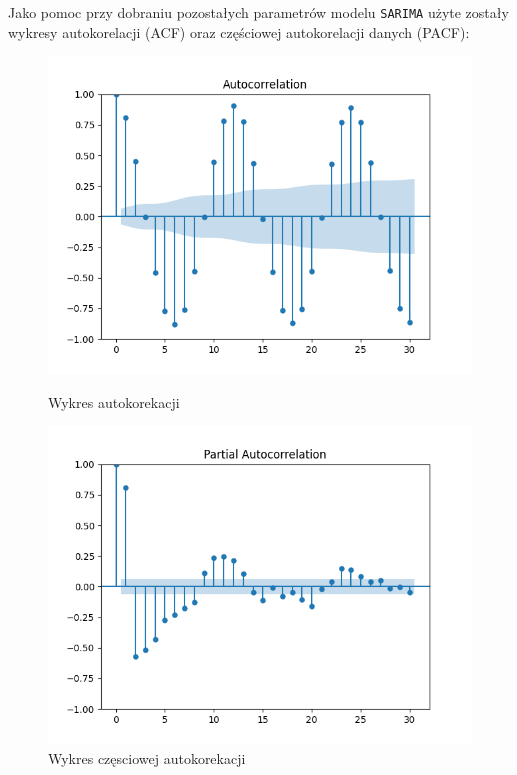 \documentclass[12pt]{article}
\begin{document}
Jako pomoc przy dobraniu pozostałych parametrów modelu \texttt{SARIMA} użyte zostały wykresy autokorelacji (ACF) oraz częściowej autokorelacji danych (PACF):

\begin{figure}[H]
    \begin{minipage}{.5\textwidth}
        \includegraphics[width=\textwidth]{img/acf.png}
        \caption{Wykres autokorekacji}
    \end{minipage}
    \begin{minipage}{.5\textwidth}
        \includegraphics[width=\textwidth]{img/pacf.png}
        \caption{Wykres częsciowej autokorekacji}
    \end{minipage}
\end{figure}
\end{document}
